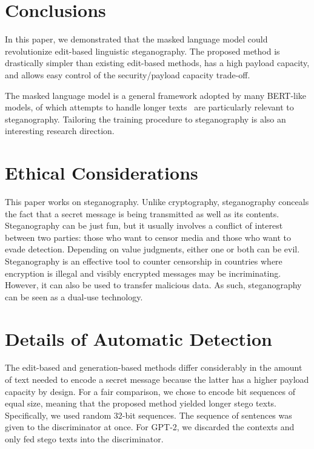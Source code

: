 \documentclass[11pt]{article}
\begin{document}
\section{Conclusions} \label{sec:conclusions}

In this paper, we demonstrated that the masked language model could revolutionize edit-based linguistic steganography.
The proposed method is drastically simpler than existing edit-based methods, has a high payload capacity, and allows easy control of the security/payload capacity trade-off.

The masked language model is a general framework adopted by many BERT-like models, of which attempts to handle longer texts~\citep{beltagy2020longformer,wang2020linformer} are particularly relevant to steganography.
Tailoring the training procedure to steganography is also an interesting research direction.



\section*{Ethical Considerations}

This paper works on steganography.
Unlike cryptography, steganography conceals the fact that a secret message is being transmitted as well as its contents.
Steganography can be just fun, but it usually involves a conflict of interest between two parties: those who want to censor media and those who want to evade detection.
Depending on value judgments, either one or both can be evil.
Steganography is an effective tool to counter censorship in countries where encryption is illegal and visibly encrypted messages may be incriminating.
However, it can also be used to transfer malicious data.
As such, steganography can be seen as a dual-use technology.




\appendix

\section{Details of Automatic Detection} \label{sec:a-auto}

The edit-based and generation-based methods differ considerably in the amount of text needed to encode a secret message because the latter has a higher payload capacity by design.
For a fair comparison, we chose to encode bit sequences of equal size, meaning that the proposed method yielded longer stego texts.
Specifically, we used random 32-bit sequences.
The sequence of sentences was given to the discriminator at once.
For GPT-2, we discarded the contexts and only fed stego texts into the discriminator.
\end{document}
